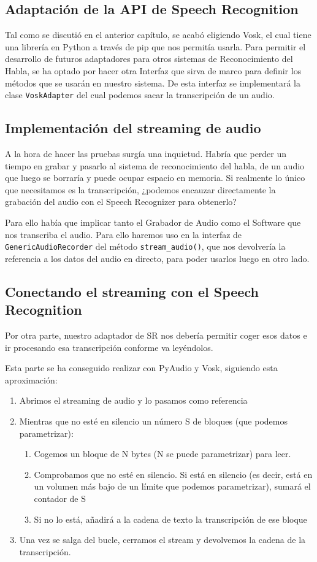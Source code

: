 \subsection{Adaptación de la API de Speech Recognition}
Tal como se discutió en el anterior capítulo, se acabó eligiendo Vosk, el cual tiene una librería en Python a través de pip que nos permitía usarla.
Para permitir el desarrollo de futuros adaptadores para otros sistemas de Reconocimiento del Habla, se ha optado por hacer otra Interfaz que sirva de marco para definir los métodos que se usarán en nuestro sistema.
De esta interfaz se implementará la clase \texttt{VoskAdapter} del cual podemos sacar la transcripción de un audio.

\subsection{Implementación del streaming de audio}
A la hora de hacer las pruebas surgía una inquietud. Habría que perder un tiempo en grabar y pasarlo al sistema de reconocimiento del habla, de un audio que luego se borraría y puede ocupar espacio en memoria. Si realmente lo único que necesitamos es la transcripción, ¿podemos encauzar directamente la grabación del audio con el Speech Recognizer para obtenerlo? 

Para ello había que implicar tanto el Grabador de Audio como el Software que nos transcriba el audio. Para ello haremos uso en la interfaz de \texttt{GenericAudioRecorder} del método \texttt{stream\_audio()}, que nos devolvería la referencia a los datos del audio en directo, para poder usarlos luego en otro lado.

\subsection{Conectando el streaming con el Speech Recognition}
Por otra parte, nuestro adaptador de SR nos debería permitir coger esos datos e ir procesando esa transcripción conforme va leyéndolos.

Esta parte se ha conseguido realizar con PyAudio y Vosk, siguiendo esta aproximación:

\begin{enumerate}
	\item Abrimos el streaming de audio y lo pasamos como referencia
	\item Mientras que no esté en silencio un número S de bloques (que podemos parametrizar):
	\begin{enumerate}
		\item Cogemos un bloque de N bytes (N se puede parametrizar) para leer.
		\item Comprobamos que no esté en silencio. Si está en silencio (es decir, está en un volumen más bajo de un límite que podemos parametrizar), sumará el contador de S
		\item Si no lo está, añadirá a la cadena de texto la transcripción de ese bloque
	\end{enumerate}
	\item Una vez se salga del bucle, cerramos el stream y devolvemos la cadena de la transcripción.
\end{enumerate}

